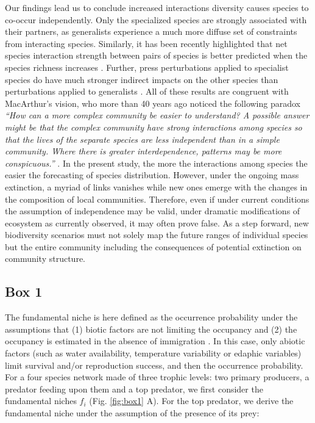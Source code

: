 Our findings lead us to conclude increased interactions diversity causes
species to co-occur independently. Only the specialized species are
strongly associated with their partners, as generalists experience a
much more diffuse set of constraints from interacting species.
Similarly, it has been recently highlighted that net species interaction
strength between pairs of species is better predicted when the species
richness increases \citep{Berlow2009}. Further, press perturbations
applied to specialist species do have much stronger indirect impacts on
the other species than perturbations applied to generalists
\citep{Montoya2009}. All of these results are congruent with MacArthur's
vision, who more than 40 years ago noticed the following paradox
\emph{``How can a more complex community be easier to understand? A
possible answer might be that the complex community have strong
interactions among species so that the lives of the separate species are
less independent than in a simple community. Where there is greater
interdependence, patterns may be more conspicuous.''}
\citep[p.199]{macarthur1972geographical}. In the present study, the more
the interactions among species the easier the forecasting of species
distribution. However, under the ongoing mass extinction, a myriad of
links vanishes while new ones emerge with the changes in the composition
of local communities. Therefore, even if under current conditions the
assumption of independence may be valid, under dramatic modifications of
ecosystem as currently observed, it may often prove false. As a step
forward, new biodiversity scenarios must not solely map the future
ranges of individual species but the entire community including the
consequences of potential extinction on community structure.

\newpage

\subsection{Box 1}\label{box-1}

\label{chap3box1}

The fundamental niche is here defined as the occurrence probability
under the assumptions that (1) biotic factors are not limiting the
occupancy and (2) the occupancy is estimated in the absence of
immigration \citep{Godsoe2010a}. In this case, only abiotic factors
(such as water availability, temperature variability or edaphic
variables) limit survival and/or reproduction success, and then the
occurrence probability. For a four species network made of three trophic
levels: two primary producers, a predator feeding upon them and a top
predator, we first consider the fundamental niches \(f_i\) (Fig.
\ref{fig:box1} A). For the top predator, we derive the fundamental niche
under the assumption of the presence of its prey:


